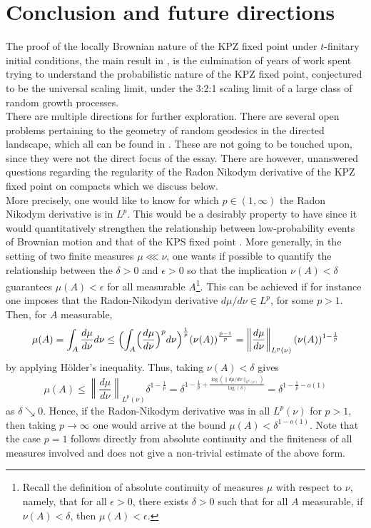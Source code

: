 \documentclass[12pt]{report}
\theoremstyle{plain}
\begin{document}
\chapter{Conclusion and future directions}

The proof of the locally Brownian nature of the KPZ fixed point under $t$-finitary initial conditions, the main result in \cite{sarkar2021brownian}, is the culmination of years of work spent trying to understand the probabilistic nature of the KPZ fixed point, conjectured to be the universal scaling limit, under the 3:2:1 scaling limit of a large class of random growth processes.\\

There are multiple directions for further exploration. There are several open problems pertaining to the geometry of random geodesics in the directed landscape, which all can be found in \cite{DOV}. These are not going to be touched upon, since they were not the direct focus of the essay. There are however, unanswered questions regarding the regularity of the Radon Nikodym derivative of the KPZ fixed point on compacts which we discuss below.\\

More precisely, one would like to know for which $p\in (1,\infty)$ the Radon Nikodym derivative is in $L^p$. This would be a desirably property to have since it would quantitatively strengthen the relationship between low-probability events of Brownian motion and that of the KPS fixed point \cite{calvert2019brownian}. More generally, in the setting of two finite measures $\mu\lll\nu$, one wants if possible to quantify the relationship between the $\delta>0$ and $\epsilon>0$ so that the implication $\nu(A)<\delta$ guarantees $\mu(A)<\epsilon$ for all measurable $A$\footnote{Recall the definition of absolute continuity of measures $\mu$ with respect to $\nu$, namely, that for all $\epsilon>0$, there exists $\delta>0$ such that for all $A$ measurable, if $\nu(A)<\delta$, then $\mu(A)<\epsilon$.}. This can be achieved if for instance one imposes that the Radon-Nikodym derivative $d\mu/d\nu\in L^p$, for some $p>1$. Then, for $A$ measurable, 
\[
\mu(A) = \displaystyle \int_{A}\frac{d\mu}{d\nu}d\nu
\leq \Bigl(\int_{A}\Bigl(\frac{d\mu}{d\nu}\Bigr)^pd\nu\Bigr)^{\frac{1}{p}}(\nu(A))^{\frac{p-1}{p}}
= \left\lVert\frac{d\mu}{d\nu}\right\rVert_{L^p(\nu)}(\nu(A))^{1-\frac{1}{p}}
\]
by applying H\"{o}lder's inequality. Thus, taking 
$\nu(A)<\delta$ gives
\[
\mu(A) \leq \left\lVert\frac{d\mu}{d\nu}\right\rVert_{L^p(\nu)}\delta^{1-\frac{1}{p}}
= \delta^{1-\frac{1}{p}+\frac{\log(\|d\mu/d\nu\|_{L^p(\nu)})}{\log(\delta)}} = \delta^{1-\frac{1}{p}-o(1)}
\]
as $\delta \searrow 0$. Hence, if the Radon-Nikodym  derivative was in all $L^p(\nu)$ for $p>1$, then taking $p\to\infty$ one would arrive at the bound $\mu(A)<\delta^{1-o(1)}$. Note that the case $p=1$ follows directly from absolute continuity and the finiteness of all measures involved and does not give a non-trivial estimate of the above form.\\
\end{document}
